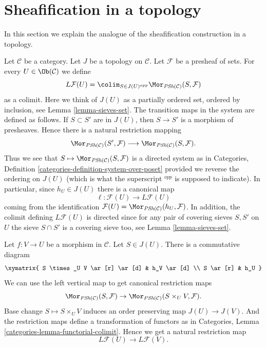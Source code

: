 \section{Sheafification in a topology}
\label{section-sheafification-topology}

\noindent
In this section we explain the analogue of the
sheafification construction in a topology.

\medskip\noindent
Let $\mathcal{C}$ be a category.
Let $J$ be a topology on $\mathcal{C}$.
Let $\mathcal{F}$ be a presheaf of sets.
For every $U \in \Ob(\mathcal{C})$ we
define
$$
L\mathcal{F}(U)
=
\colim_{S \in J(U)^{opp}}
\Mor_{\textit{PSh}(\mathcal{C})}(S, \mathcal{F})
$$
as a colimit. Here we think of $J(U)$ as a partially ordered set,
ordered by inclusion, see Lemma \ref{lemma-sieves-set}. The transition
maps in the system are defined as follows.
If $S \subset S'$ are in $J(U)$, then $S \to S'$ is
a morphism of presheaves. Hence there is a natural restriction
mapping
$$
\Mor_{\textit{PSh}(\mathcal{C})}(S', \mathcal{F})
\longrightarrow
\Mor_{\textit{PSh}(\mathcal{C})}(S, \mathcal{F}).
$$
Thus we see that
$S \mapsto \Mor_{\textit{PSh}(\mathcal{C})}(S, \mathcal{F})$
is a directed system as in Categories,
Definition \ref{categories-definition-system-over-poset}
provided we reverse the ordering
on $J(U)$ (which is what the superscript ${}^{opp}$ is supposed to
indicate). In particular, since $h_U \in J(U)$
there is a canonical map
$$
\ell : \mathcal{F}(U) \longrightarrow L\mathcal{F}(U)
$$
coming from the identification
$\mathcal{F}(U) = \Mor_{\textit{PSh}(\mathcal{C})}(h_U, \mathcal{F})$.
In addition, the colimit defining $L\mathcal{F}(U)$ is directed
since for any pair of covering sieves $S, S'$ on $U$ the
sieve $S \cap S'$ is a covering sieve too, see Lemma \ref{lemma-sieves-set}.

\medskip\noindent
Let $f : V \to U$ be a morphism in $\mathcal{C}$.
Let $S \in J(U)$. There is a commutative diagram
$$
\xymatrix{
S \times_U V \ar[r] \ar[d] & h_V \ar[d] \\
S \ar[r] & h_U
}
$$
We can use the left vertical map to get canonical restriction maps
$$
\Mor_{\textit{PSh}(\mathcal{C})}(S, \mathcal{F})
\to \Mor_{\textit{PSh}(\mathcal{C})}(S \times_U V, \mathcal{F}).
$$
Base change $S \mapsto S \times_U V$ induces an order
preserving map $J(U) \to J(V)$. And the restriction maps
define a transformation of functors as in
Categories, Lemma \ref{categories-lemma-functorial-colimit}.
Hence we get a natural restriction map
$$
L\mathcal{F}(U) \longrightarrow L\mathcal{F}(V).
$$


